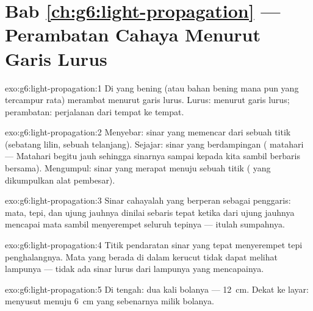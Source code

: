 \section*{Bab \ref{ch:g6:light-propagation} --- Perambatan Cahaya Menurut Garis Lurus}

\begin{solution}{exo:g6:light-propagation:1}
Di  yang bening (atau bahan bening mana pun yang tercampur rata)
 merambat menurut garis lurus. Lurus: menurut garis lurus;
perambatan: perjalanan  dari tempat ke tempat.
\end{solution}

\begin{solution}{exo:g6:light-propagation:2}
Menyebar: sinar yang memencar dari sebuah titik (sebatang lilin,
sebuah  telanjang). Sejajar: sinar yang berdampingan (
matahari --- Matahari begitu jauh sehingga sinarnya sampai kepada kita
sambil berbaris bersama). Mengumpul: sinar yang merapat menuju sebuah
titik ( yang dikumpulkan alat pembesar).
\end{solution}

\begin{solution}{exo:g6:light-propagation:3}
Sinar cahayalah yang berperan sebagai penggaris: mata, tepi, dan ujung
jauhnya dinilai sebaris tepat ketika  dari ujung jauhnya
mencapai mata sambil menyerempet seluruh tepinya --- 
itulah sumpahnya.
\end{solution}

\begin{solution}{exo:g6:light-propagation:4}
Titik pendaratan sinar yang tepat menyerempet tepi penghalangnya. Mata
yang berada di dalam kerucut  tidak dapat melihat
lampunya --- tidak ada sinar lurus dari lampunya yang mencapainya.
\end{solution}

\begin{solution}{exo:g6:light-propagation:5}
Di tengah:  dua kali bolanya --- \qty{12}{cm}. Dekat
ke layar:  menyusut menuju \qty{6}{cm} yang
sebenarnya milik bolanya.
\end{solution}

